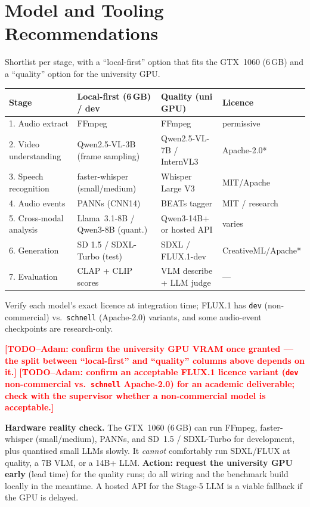 \documentclass[11pt,a4paper]{article}
\newcommand{\TODO}[1]{\textcolor{red}{\textbf{[TODO--Adam: #1]}}}
\begin{document}
\section{Model and Tooling Recommendations}\label{sec:models}
Shortlist per stage, with a ``local-first'' option that fits the GTX~1060 (6\,GB) and a ``quality''
option for the university GPU.

\begin{center}
\begin{longtable}{@{}p{2.7cm}p{4.3cm}p{4.6cm}p{2.4cm}@{}}
\toprule
\textbf{Stage} & \textbf{Local-first (6\,GB) / dev} & \textbf{Quality (uni GPU)} & \textbf{Licence} \\
\midrule
\endhead
1. Audio extract & FFmpeg & FFmpeg & permissive \\
2. Video understanding & Qwen2.5-VL-3B (frame sampling) & Qwen2.5-VL-7B / InternVL3 & Apache-2.0* \\
3. Speech recognition & faster-whisper (small/medium) & Whisper Large V3 & MIT/Apache \\
4. Audio events & PANNs (CNN14) & BEATs tagger & MIT / research \\
5. Cross-modal analysis & Llama~3.1-8B / Qwen3-8B (quant.) & Qwen3-14B+ or hosted API & varies \\
6. Generation & SD 1.5 / SDXL-Turbo (test) & SDXL / FLUX.1-dev & CreativeML/Apache* \\
7. Evaluation & CLAP + CLIP scores & VLM describe + LLM judge & --- \\
\bottomrule
\end{longtable}
\end{center}
\footnotesize *Verify each model's exact licence at integration time; FLUX.1 has \texttt{dev}
(non-commercial) vs.\ \texttt{schnell} (Apache-2.0) variants, and some audio-event checkpoints are
research-only. \normalsize
\smallskip

\noindent\TODO{confirm the university GPU VRAM once granted --- the split between ``local-first'' and
``quality'' columns above depends on it.} \TODO{confirm an acceptable FLUX.1 licence variant
(\texttt{dev} non-commercial vs.\ \texttt{schnell} Apache-2.0) for an academic deliverable; check
with the supervisor whether a non-commercial model is acceptable.}

\medskip
\noindent\textbf{Hardware reality check.} The GTX~1060 (6\,GB) can run FFmpeg, faster-whisper
(small/medium), PANNs, and SD~1.5 / SDXL-Turbo for development, plus quantised small LLMs slowly.
It \emph{cannot} comfortably run SDXL/FLUX at quality, a 7B VLM, or a 14B+ LLM. \textbf{Action:
request the university GPU early} (lead time) for the quality runs; do all wiring and the benchmark
build locally in the meantime. A hosted API for the Stage-5 LLM is a viable fallback if the GPU is
delayed.
\end{document}
